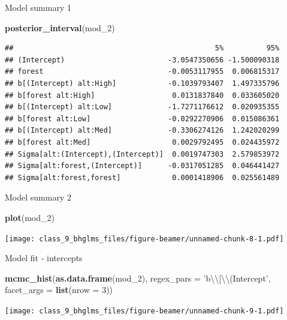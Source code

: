 \documentclass[ignorenonframetext,]{beamer}
\newenvironment{Shaded}{\begin{snugshade}}{\end{snugshade}}
\newcommand{\KeywordTok}[1]{\textcolor[rgb]{0.13,0.29,0.53}{\textbf{#1}}}
\newcommand{\DataTypeTok}[1]{\textcolor[rgb]{0.13,0.29,0.53}{#1}}
\newcommand{\DecValTok}[1]{\textcolor[rgb]{0.00,0.00,0.81}{#1}}
\newcommand{\CharTok}[1]{\textcolor[rgb]{0.31,0.60,0.02}{#1}}
\newcommand{\StringTok}[1]{\textcolor[rgb]{0.31,0.60,0.02}{#1}}
\newcommand{\NormalTok}[1]{#1}
\begin{document}
\begin{frame}[fragile]{Model summary 1}

\tiny

\begin{Shaded}
\begin{Highlighting}[]
\KeywordTok{posterior_interval}\NormalTok{(mod_}\DecValTok{2}\NormalTok{)}
\end{Highlighting}
\end{Shaded}

\begin{verbatim}
##                                               5%          95%
## (Intercept)                        -3.0547350656 -1.500090318
## forest                             -0.0053117955  0.006815317
## b[(Intercept) alt:High]            -0.1039793407  1.497335796
## b[forest alt:High]                  0.0131837840  0.033605020
## b[(Intercept) alt:Low]             -1.7271176612  0.020935355
## b[forest alt:Low]                  -0.0292270906  0.015086361
## b[(Intercept) alt:Med]             -0.3306274126  1.242020299
## b[forest alt:Med]                   0.0029792495  0.024435972
## Sigma[alt:(Intercept),(Intercept)]  0.0019747303  2.579853972
## Sigma[alt:forest,(Intercept)]      -0.0317051285  0.046441427
## Sigma[alt:forest,forest]            0.0001418906  0.025561489
\end{verbatim}

\end{frame}

\begin{frame}[fragile]{Model summary 2}

\begin{Shaded}
\begin{Highlighting}[]
\KeywordTok{plot}\NormalTok{(mod_}\DecValTok{2}\NormalTok{)}
\end{Highlighting}
\end{Shaded}

\texttt{[image: class\_9\_bhglms\_files/figure-beamer/unnamed-chunk-8-1.pdf]}

\end{frame}

\begin{frame}[fragile]{Model fit - intercepts}

\begin{Shaded}
\begin{Highlighting}[]
\KeywordTok{mcmc_hist}\NormalTok{(}\KeywordTok{as.data.frame}\NormalTok{(mod_}\DecValTok{2}\NormalTok{), }
          \DataTypeTok{regex_pars =} \StringTok{'b}\CharTok{\textbackslash{}\textbackslash{}}\StringTok{[}\CharTok{\textbackslash{}\textbackslash{}}\StringTok{(Intercept'}\NormalTok{,}
          \DataTypeTok{facet_args =} \KeywordTok{list}\NormalTok{(}\DataTypeTok{nrow =} \DecValTok{3}\NormalTok{))}
\end{Highlighting}
\end{Shaded}

\texttt{[image: class\_9\_bhglms\_files/figure-beamer/unnamed-chunk-9-1.pdf]}

\end{frame}
\end{document}
